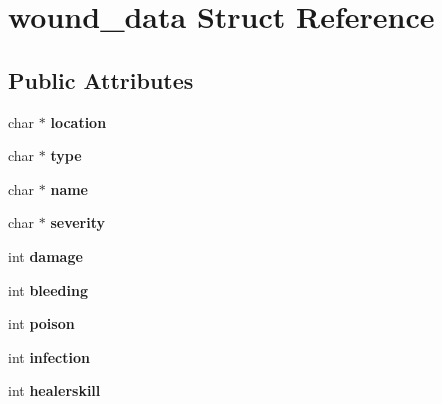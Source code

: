 \hypertarget{structwound__data}{\section{wound\-\_\-data Struct Reference}
\label{structwound__data}
}
\subsection*{Public Attributes}
\begin{DoxyCompactItemize}
\item 
\hypertarget{structwound__data_a2be5f7c5b4eb38dbb6bb79af189c655c}{char $\ast$ {\bfseries location}}\label{structwound__data_a2be5f7c5b4eb38dbb6bb79af189c655c}

\item 
\hypertarget{structwound__data_a4e948e084dc2302ff639487fd52efff1}{char $\ast$ {\bfseries type}}\label{structwound__data_a4e948e084dc2302ff639487fd52efff1}

\item 
\hypertarget{structwound__data_ae70e3e3fb9e71ac3a53fc0cc57a3770c}{char $\ast$ {\bfseries name}}\label{structwound__data_ae70e3e3fb9e71ac3a53fc0cc57a3770c}

\item 
\hypertarget{structwound__data_aa16c2ce2d57f9e2d99d8d1de805e5610}{char $\ast$ {\bfseries severity}}\label{structwound__data_aa16c2ce2d57f9e2d99d8d1de805e5610}

\item 
\hypertarget{structwound__data_aa6f172445dca229d7781f4dfdc895050}{int {\bfseries damage}}\label{structwound__data_aa6f172445dca229d7781f4dfdc895050}

\item 
\hypertarget{structwound__data_a59a84f83cfb4885e6e9bb2782265b100}{int {\bfseries bleeding}}\label{structwound__data_a59a84f83cfb4885e6e9bb2782265b100}

\item 
\hypertarget{structwound__data_afaac7fc7d77e319662551ac5203812a4}{int {\bfseries poison}}\label{structwound__data_afaac7fc7d77e319662551ac5203812a4}

\item 
\hypertarget{structwound__data_aa1b6d71d3730dd8f645c9bedd193fabe}{int {\bfseries infection}}\label{structwound__data_aa1b6d71d3730dd8f645c9bedd193fabe}

\item 
\hypertarget{structwound__data_a7d4f9e5da9b43e9c8c853331e1ce4265}{int {\bfseries healerskill}}\label{structwound__data_a7d4f9e5da9b43e9c8c853331e1ce4265}


\end{DoxyCompactItemize}
